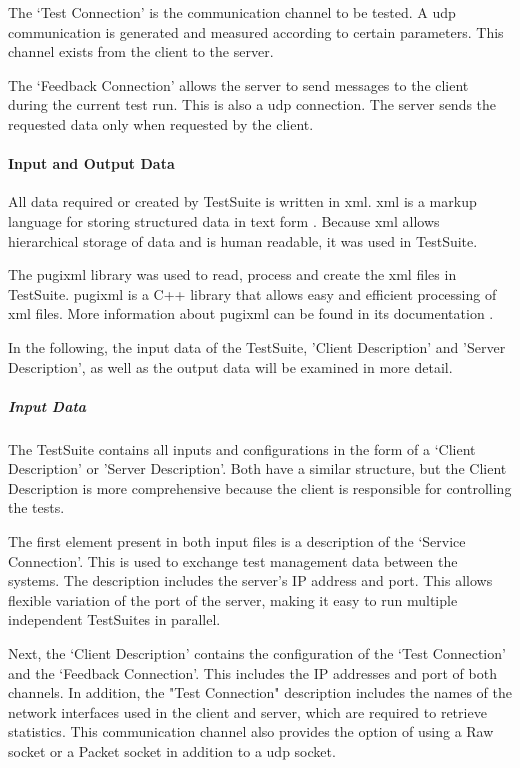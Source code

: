 The `Test Connection' is the communication channel to be tested. A \ac{udp} communication is generated and measured according to certain parameters. This channel exists from the client to the server.

The `Feedback Connection' allows the server to send messages to the client during the current test run. This is also a \ac{udp} connection. The server sends the requested data only when requested by the client.

\paragraph{Input and Output Data}
All data required or created by TestSuite is written in \ac{xml}. \ac{xml} is a markup language for storing structured data in text form \cite{tsd01}. Because \ac{xml} allows hierarchical storage of data and is human readable, it was used in TestSuite.

The pugixml library was used to read, process and create the \ac{xml} files in TestSuite. pugixml is a C++ library that allows easy and efficient processing of \ac{xml} files. More information about pugixml can be found in its documentation \cite{tsd02}.

In the following, the input data of the TestSuite, 'Client Description' and 'Server Description', as well as the output data will be examined in more detail.

\subparagraph{Input Data}
The TestSuite contains all inputs and configurations in the form of a `Client Description' or 'Server Description'. Both have a similar structure, but the Client Description is more comprehensive because the client is responsible for controlling the tests.

The first element present in both input files is a description of the `Service Connection'. This is used to exchange test management data between the systems. The description includes the server's IP address and port. This allows flexible variation of the port of the server, making it easy to run multiple independent TestSuites in parallel.

Next, the `Client Description' contains the configuration of the `Test Connection' and the `Feedback Connection'. This includes the IP addresses and port of both channels. In addition, the "Test Connection" description includes the names of the network interfaces used in the client and server, which are required to retrieve statistics. This communication channel also provides the option of using a Raw socket or a Packet socket in addition to a \ac{udp} socket.

